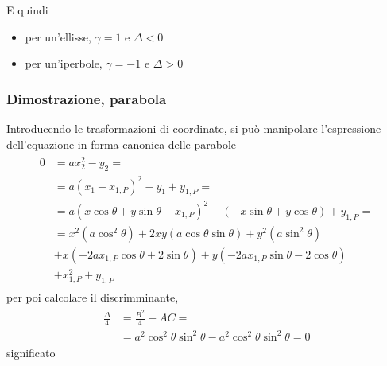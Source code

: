 \documentclass[letterpaper,10pt,english]{jupyterBook}
\begin{document}
\sphinxAtStartPar
E quindi
\begin{itemize}
\item {} 
\sphinxAtStartPar
per un’ellisse, \(\gamma = 1\) e \(\Delta < 0\)

\item {} 
\sphinxAtStartPar
per un’iperbole, \(\gamma =-1\) e \(\Delta > 0\)

\end{itemize}
\subsubsection*{Dimostrazione, parabola}

\sphinxAtStartPar
Introducendo le trasformazioni di coordinate, si può manipolare l’espressione dell’equazione in forma canonica delle parabole
\begin{equation*}
\begin{split}\begin{aligned}
  0
  & = a x_2^2 - y_2 = \\
  & = a ( x_1 - x_{1,P} )^2 - y_1 + y_{1,P} = \\
  & = a ( x \cos \theta + y \sin \theta - x_{1,P} )^2 - ( - x \sin \theta + y \cos \theta ) + y_{1,P} = \\
  & = x^2   \left( a \cos^2 \theta \right)
    + 2 x y \left( a \cos \theta \sin \theta \right) 
    + y^2   \left( a \sin^2 \theta \right) \\
  & + x     \left( - 2 a x_{1,P} \cos \theta + 2 \sin \theta \right) 
    + y     \left( - 2 a x_{1,P} \sin \theta - 2 \cos \theta \right) \\
  & + x_{1,P}^2 + y_{1,P}
\end{aligned}\end{split}
\end{equation*}
\sphinxAtStartPar
per poi calcolare il discrimminante,
\begin{equation*}
\begin{split}\begin{aligned}
  \frac{\Delta}{4}
  & = \frac{B^2}{4} - AC = \\
  & = a^2 \cos^2 \theta \sin^2 \theta - a^2 \cos^2 \theta \sin^2 \theta = 0
\end{aligned}\end{split}
\end{equation*}
\sphinxAtStartPar
{} significato


\subsubsection{}
\label{\detokenize{ch/analytic_geometry/analytic_geometry_2d/conics-general:id1}}
\end{document}
